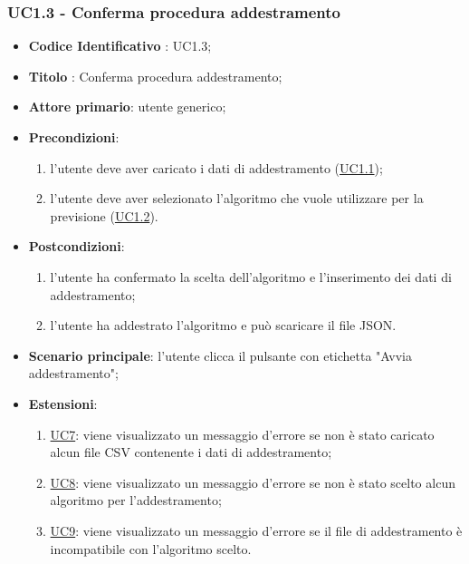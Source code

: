 	\subsubsection{UC1.3 - Conferma procedura addestramento}
		\begin{itemize}
			\item\textbf{Codice Identificativo} : UC1.3;
			\item\textbf{Titolo} : Conferma procedura addestramento;
			\item\textbf{Attore primario}: utente generico;
			\item\textbf{Precondizioni}:
				\begin{enumerate}
					\item l'utente deve aver caricato i dati di addestramento (\hyperref[par:UC1.1]{UC1.1});
					\item l'utente deve aver selezionato l'algoritmo che vuole utilizzare per la previsione (\hyperref[par:UC1.2]{UC1.2}).
				\end{enumerate}
			\item\textbf{Postcondizioni}:
				\begin{enumerate}
					\item l'utente ha confermato la scelta dell'algoritmo e l'inserimento dei dati di addestramento;
					\item l'utente ha addestrato l'algoritmo e può scaricare il file JSON.
				\end{enumerate}
			\item\textbf{Scenario principale}: l'utente clicca il pulsante con etichetta "Avvia addestramento";
			\item\textbf{Estensioni}:
			\begin{enumerate}
				\item \hyperref[par:UC7]{UC7}: viene visualizzato un messaggio d'errore se non è stato caricato alcun file CSV contenente i dati di addestramento;
				\item \hyperref[par:UC8]{UC8}: viene visualizzato un messaggio d'errore se non è stato scelto alcun algoritmo per l'addestramento;
				\item \hyperref[par:UC9]{UC9}: viene visualizzato un messaggio d'errore se il file di addestramento è incompatibile con l'algoritmo scelto.
			\end{enumerate}
			 
						
		\end{itemize}
		
	\label{par:UC1.4}
